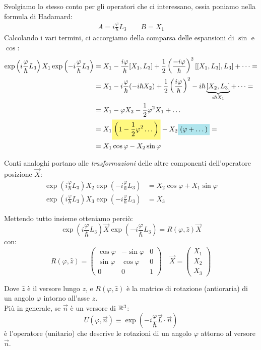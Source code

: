 \documentclass[../../FisicaTeorica.tex]{subfiles}
\begin{document}
Svolgiamo lo stesso conto per gli operatori che ci interessano, ossia poniamo nella formula di Hadamard:
\begin{align*}
A = i\frac{\varphi}{\hbar}L_3\qquad B = X_1
\end{align*}
Calcolando i vari termini, ci accorgiamo della comparsa delle espansioni di $\sin$ e $\cos$:
\begin{align*}
\exp\left(i\frac{\varphi}{\hbar}L_3 \right) X_1 \exp\left(-i\frac{\varphi}{\hbar}L_3 \right) &= X_1 - \frac{i\varphi}{\hbar}[X_1, L_3]+ \frac{1}{2}\left(\frac{-i\varphi}{\hbar}\right)^2 [[X_1, L_3], L_3] + \dots =\\
&= X_1 - i\frac{\varphi}{\hbar}(-i\hbar X_2)+\frac{1}{2}\left(\frac{i\varphi}{\hbar}\right)^2 -i\hbar \underbrace{[X_2,L_3]}_{i\hbar X_1}+\dots=\\
&=X_1 - \varphi X_2 - \frac{1}{2}\varphi^2 X_1 + \dots \\
&= X_1\hlc{Yellow}{\left(1-\frac{1}{2}\varphi^2 \dots\right)} - X_2\hlc{SkyBlue}{(\varphi + \dots)} =\\
&= X_1 \cos\varphi - X_2 \sin\varphi
\end{align*} 

Conti analoghi portano alle \textit{trasformazioni} delle altre componenti dell'operatore posizione $\vec{X}$:
\begin{align*}
\exp\left(i\frac{\varphi}{\hbar}L_3\right) X_2 \exp\left(-i\frac{\varphi}{\hbar} L_3 \right)&=X_2 \cos\varphi+X_1\sin\varphi\\
\exp\left(i\frac{\varphi}{\hbar}L_3\right) X_3 \exp\left(-i\frac{\varphi}{\hbar}L_3\right)&= X_3
\end{align*}

Mettendo tutto insieme otteniamo perciò:
\[
\exp\left(i\frac{\varphi}{\hbar}L_3\right) \vec{X} \exp\left(-i\frac{\varphi}{\hbar}L_3 \right) = R(\varphi, \hat{z}) \vec{X}
\]
con:
\[
R(\varphi, \hat{z}) = \begin{pmatrix}
\cos\varphi & -\sin\varphi & 0\\
\sin\varphi & \cos\varphi & 0\\
0 & 0 & 1
\end{pmatrix}\quad
\vec{X}=\begin{pmatrix} X_1 \\ X_2 \\ X_3 \end{pmatrix}
\]

Dove $\hat{z}$ è il versore lungo $z$, e $R(\varphi, \hat{z})$ è la matrice di rotazione (antioraria) di un angolo $\varphi$ intorno all'asse $z$.\\
Più in generale, se $\vec{n}$ è un versore di $\mathbb{R}^3$:
\[
U(\varphi, \vec{n})\equiv \exp\left({-i\frac{\varphi}{\hbar} \vec{L}\cdot \vec{n}}\right)
\]
è l'operatore (unitario) che descrive le rotazioni di un angolo $\varphi$ attorno al versore $\vec{n}$.\\
\end{document}
